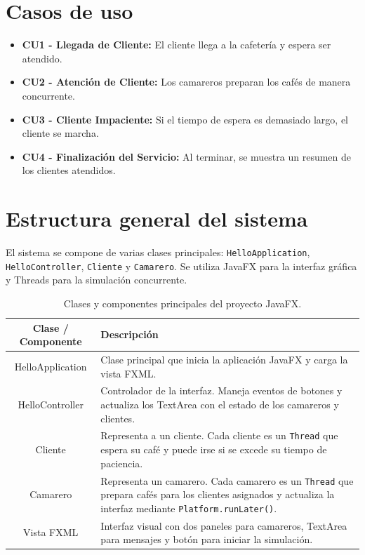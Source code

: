 \documentclass{article}
\begin{document}
\section{Casos de uso}
\begin{itemize}
    \item \textbf{CU1 - Llegada de Cliente:} El cliente llega a la cafetería y espera ser atendido.
    \item \textbf{CU2 - Atención de Cliente:} Los camareros preparan los cafés de manera concurrente.
    \item \textbf{CU3 - Cliente Impaciente:} Si el tiempo de espera es demasiado largo, el cliente se marcha.
    \item \textbf{CU4 - Finalización del Servicio:} Al terminar, se muestra un resumen de los clientes atendidos.
\end{itemize}



\newpage
\section{Estructura general del sistema}
El sistema se compone de varias clases principales: \texttt{HelloApplication}, \texttt{HelloController}, \texttt{Cliente} y \texttt{Camarero}.  
Se utiliza JavaFX para la interfaz gráfica y Threads para la simulación concurrente.  

\begin{table}[h!]
\centering
\begin{tabular}{|c|p{10cm}|}
\hline
\textbf{Clase / Componente} & \textbf{Descripción} \\
\hline
HelloApplication & Clase principal que inicia la aplicación JavaFX y carga la vista FXML. \\
\hline
HelloController & Controlador de la interfaz. Maneja eventos de botones y actualiza los TextArea con el estado de los camareros y clientes. \\
\hline
Cliente & Representa a un cliente. Cada cliente es un \texttt{Thread} que espera su café y puede irse si se excede su tiempo de paciencia. \\
\hline
Camarero & Representa un camarero. Cada camarero es un \texttt{Thread} que prepara cafés para los clientes asignados y actualiza la interfaz mediante \texttt{Platform.runLater()}. \\
\hline
Vista FXML & Interfaz visual con dos paneles para camareros, TextArea para mensajes y botón para iniciar la simulación. \\
\hline
\end{tabular}
\caption{Clases y componentes principales del proyecto JavaFX.}
\label{tab:clasesJavaFX}
\end{table}
\end{document}
